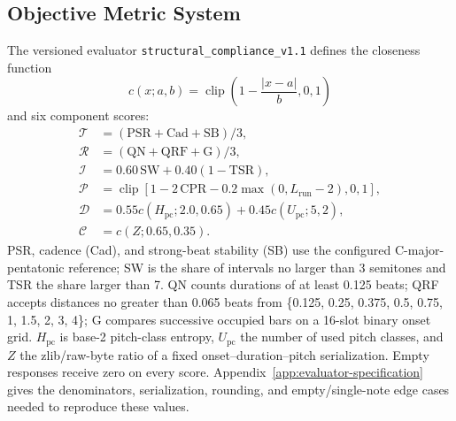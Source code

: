 \documentclass[11pt,a4paper]{article}
\begin{document}
\subsection{Objective Metric System}
\label{subsec:metrics}

The versioned evaluator \texttt{structural\_compliance\_v1.1} defines the closeness function
\begin{equation}
c(x;a,b)=\operatorname{clip}\left(1-\frac{|x-a|}{b},0,1\right)
\end{equation}
and six component scores:
\begin{align}
\mathcal T &= (\mathrm{PSR}+\mathrm{Cad}+\mathrm{SB})/3,\\
\mathcal R &= (\mathrm{QN}+\mathrm{QRF}+\mathrm{G})/3,\\
\mathcal I &=0.60\,\mathrm{SW}+0.40(1-\mathrm{TSR}),\\
\mathcal P &=\operatorname{clip}[1-2\,\mathrm{CPR}-0.2\max(0,L_{\mathrm{run}}-2),0,1],\\
\mathcal D &=0.55c(H_{\mathrm{pc}};2.0,0.65)+0.45c(U_{\mathrm{pc}};5,2),\\
\mathcal C &=c(Z;0.65,0.35).
\end{align}
PSR, cadence (Cad), and strong-beat stability (SB) use the configured C-major-pentatonic reference; SW is the share of intervals no larger than 3 semitones and TSR the share larger than 7. QN counts durations of at least 0.125 beats; QRF accepts distances no greater than 0.065 beats from \{0.125, 0.25, 0.375, 0.5, 0.75, 1, 1.5, 2, 3, 4\}; G compares successive occupied bars on a 16-slot binary onset grid. $H_{\mathrm{pc}}$ is base-2 pitch-class entropy, $U_{\mathrm{pc}}$ the number of used pitch classes, and $Z$ the zlib/raw-byte ratio of a fixed onset--duration--pitch serialization. Empty responses receive zero on every score. Appendix~\ref{app:evaluator-specification} gives the denominators, serialization, rounding, and empty/single-note edge cases needed to reproduce these values.
\end{document}
